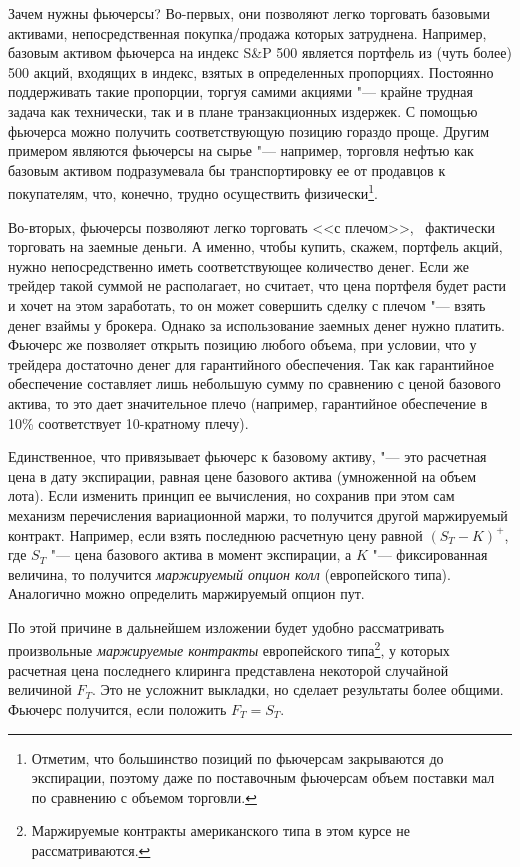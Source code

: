 \begin{remark}
Зачем нужны фьючерсы?
Во-первых, они позволяют легко торговать базовыми активами, непосредственная покупка/продажа которых затруднена.
Например, базовым активом фьючерса на индекс S\&P 500 является портфель из (чуть более) 500 акций, входящих в индекс, взятых в определенных пропорциях.
Постоянно поддерживать такие пропорции, торгуя самими акциями "--- крайне трудная задача как технически, так и в плане транзакционных издержек.
С помощью фьючерса можно получить соответствующую позицию гораздо проще.
Другим примером являются фьючерсы на сырье "--- например, торговля нефтью как базовым активом подразумевала бы транспортировку ее от продавцов к покупателям, что, конечно, трудно осуществить физически\footnote{Отметим, что большинство позиций по фьючерсам закрываются до экспирации, поэтому даже по поставочным фьючерсам объем поставки мал по сравнению с объемом торговли.}.

Во-вторых, фьючерсы позволяют легко торговать <<с плечом>>, \te\ фактически торговать на заемные деньги. 
А именно, чтобы купить, скажем, портфель акций, нужно непосредственно иметь соответствующее количество денег.
Если же трейдер такой суммой не располагает, но считает, что цена портфеля будет расти и хочет на этом заработать, то он может совершить сделку с плечом "--- взять денег взаймы у брокера.
Однако за использование заемных денег нужно платить.
Фьючерс же позволяет открыть позицию любого объема, при условии, что у трейдера достаточно денег для гарантийного обеспечения.
Так как гарантийное обеспечение составляет лишь небольшую сумму по сравнению с ценой базового актива, то это дает значительное плечо (например, гарантийное обеспечение в 10\%  соответствует 10-кратному плечу).
\end{remark}


\begin{remark}
\label{fut:r:mtm-contract}
Единственное, что привязывает фьючерс к базовому активу, "--- это расчетная цена в дату экспирации, равная цене базового актива (умноженной на объем лота). 
Если изменить принцип ее вычисления, но сохранив при этом сам механизм перечисления вариационной маржи, то получится другой маржируемый контракт.
Например, если взять последнюю расчетную цену равной $(S_T-K)^+$, где $S_T$ "--- цена базового актива в момент экспирации, а $K$ "--- фиксированная величина, то получится \emph{маржируемый опцион колл} (европейского типа).
Аналогично можно определить маржируемый опцион пут.

По этой причине в дальнейшем изложении будет удобно рассматривать произвольные \emph{маржируемые контракты} европейского типа\footnote{Маржируемые контракты американского типа в этом курсе не рассматриваются.}, у которых расчетная цена последнего клиринга представлена некоторой случайной величиной $F_T$.
Это не усложнит выкладки, но сделает результаты более общими.
Фьючерс получится, если положить $F_T=S_T$.
\end{remark}

